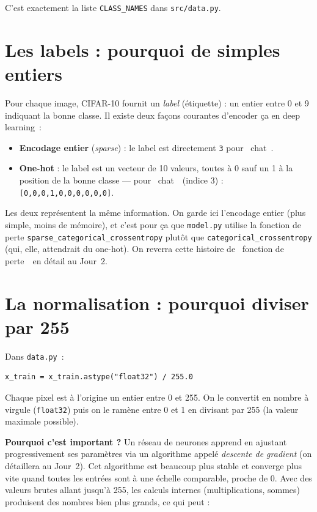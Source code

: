 \documentclass[11pt,a4paper]{article}
\begin{document}
C'est exactement la liste \texttt{CLASS\_NAMES} dans \texttt{src/data.py}.

\section{Les labels : pourquoi de simples entiers}

Pour chaque image, CIFAR-10 fournit un \emph{label} (\'etiquette) : un
entier entre 0 et 9 indiquant la bonne classe. Il existe deux fa\c{c}ons
courantes d'encoder \c{c}a en deep learning~:

\begin{itemize}
  \item \textbf{Encodage entier} (\emph{sparse}) : le label est
  directement \texttt{3} pour \guillemotleft~chat~\guillemotright.
  \item \textbf{One-hot} : le label est un vecteur de 10 valeurs, toutes
  \`a 0 sauf un 1 \`a la position de la bonne classe --- pour \guillemotleft~chat~\guillemotright\
  (indice 3) : \texttt{[0,0,0,1,0,0,0,0,0,0]}.
\end{itemize}

Les deux repr\'esentent la m\^eme information. On garde ici l'encodage
entier (plus simple, moins de m\'emoire), et c'est pour \c{c}a que
\texttt{model.py} utilise la fonction de perte
\texttt{sparse\_categorical\_\allowbreak crossentropy} plut\^ot que
\texttt{categorical\_crossentropy} (qui, elle, attendrait du one-hot). On
reverra cette histoire de \guillemotleft~fonction de perte~\guillemotright\ en d\'etail au
Jour~2.

\section{La normalisation : pourquoi diviser par 255}

Dans \texttt{data.py}~:
\begin{lstlisting}
x_train = x_train.astype("float32") / 255.0
\end{lstlisting}

Chaque pixel est \`a l'origine un entier entre 0 et 255. On le convertit
en nombre \`a virgule (\texttt{float32}) puis on le ram\`ene entre 0 et 1
en divisant par 255 (la valeur maximale possible).

\textbf{Pourquoi c'est important ?} Un r\'eseau de neurones apprend en
ajustant progressivement ses param\`etres via un algorithme appel\'e
\emph{descente de gradient} (on d\'etaillera au Jour~2). Cet algorithme
est beaucoup plus stable et converge plus vite quand toutes les entr\'ees
sont \`a une \'echelle comparable, proche de 0. Avec des valeurs brutes
allant jusqu'\`a 255, les calculs internes (multiplications, sommes)
produisent des nombres bien plus grands, ce qui peut :
\end{document}

